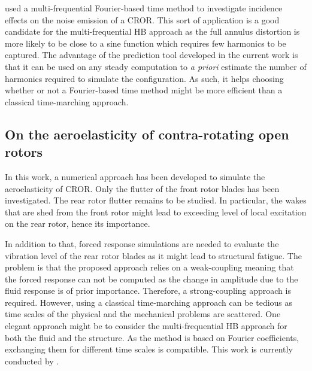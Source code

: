 \citet{Ferrante2013} used a multi-frequential Fourier-based time
method to investigate incidence effects on the noise
emission of a CROR. This sort of application is a good candidate
for the multi-frequential HB approach as the full annulus
distortion is more likely to be close to a sine function which
requires few harmonics to be captured. The advantage of the
prediction tool developed in the current work is that
it can be used on any steady computation to \emph{a priori}
estimate the number of harmonics required to simulate the
configuration. As such, it helps choosing whether or not
a Fourier-based time method might be more efficient than
a classical time-marching approach.


\subsection*{On the aeroelasticity of contra-rotating open rotors}

In this work, a numerical approach has been developed to
simulate the aeroelasticity of CROR. Only the flutter of the
front rotor blades has been investigated. The rear rotor
flutter remains to be studied. In particular, the wakes that are
shed from the front rotor might lead to exceeding level of
local excitation on the rear rotor, hence its importance.

In addition to that, forced
response simulations are needed to evaluate the vibration
level of the rear rotor blades as it might lead
to structural fatigue.
The problem is that the
proposed approach relies on a weak-coupling meaning
that the forced response can not be computed as the
change in amplitude due to the fluid response is of
prior importance. Therefore, a strong-coupling approach
is required. However, using a classical time-marching approach
can be tedious as time scales of the physical 
and the mechanical problems are scattered. One elegant approach might
be to consider the multi-frequential HB approach for both the
fluid and the structure. As the method is based on Fourier coefficients,
exchanging them for different time scales is compatible.
This work is currently conducted by \citet{ThesisCadel}.
